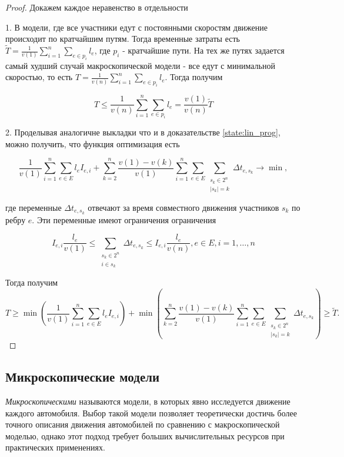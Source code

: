 \documentclass[12pt, a4paper]{article}
\DeclareMathOperator*{\minn}{min}
\begin{document}
\begin{proof}
	Докажем каждое неравенство в отдельности
	
	1. В модели, где все участники едут с постоянными скоростям движение происходит по кратчайшим путям. Тогда временные затраты есть $\widetilde{T} = \frac{1}{v(1)} \sum \limits _{i = 1} ^ n \sum\limits_{e \in p_i} l_e$, где $p_i$ - кратчайшие пути.
	На тех же путях задается самый худший случай макроскопической модели - все едут с минимальной скоростью, то есть $ T = \frac{1}{v(n)} \sum \limits _{i = 1} ^ n \sum\limits_{e \in p_i} l_e$. Тогда получим
	
	$$T \le  \frac{1}{v(n)} \sum \limits _{i = 1} ^ n \sum\limits_{e \in p_i} l_e = \frac {v(1)}{v(n)} \widetilde{T}$$
	
	2. Проделывая аналогичне выкладки что и в доказательстве \ref{state:lin_prog}, можно получить, что функция оптимизация есть 
	
	$$ \frac{1}{v (1)} \sum\limits_{i = 1}^n \sum \limits _{e \in E} l_e I_{e, i} +  \sum\limits_{k = 2}^{n} \frac{v(1) - v(k)}{v (1)}  \sum\limits_{i = 1}^n \sum \limits _{e \in E} \sum\limits _{\substack{ s_k \in 2^n \\ |s_k| = k}}  \Delta t_{e, s_k} \rightarrow \minn ,$$
	
	где переменные $\Delta t_{e, s_k}$ отвечают за время совместного движения участников $s_k$ по ребру $e$. Эти переменные имеют ограничения ограничения
    
    $$I_{e, i} \frac{l_e}{v(1)} \le  \sum\limits _{\substack{ s_k \in 2^n \\ i \in s_k}}  \Delta t_{e, s_k} \le I_{e, i} \frac{l_e}{v(n)} , e \in E,  i = 1, \dots, n$$
	
	Тогда получим
		$$T \ge 
		  \minn \left(  \frac{1}{v (1)} \sum\limits_{i = 1}^n \sum \limits _{e \in E} l_e I_{e, i} \right) 
		+ \minn \left(  \sum\limits_{k = 2}^{n} \frac{v(1) - v(k)}{v (1)}  \sum\limits_{i = 1}^n \sum \limits _{e \in E} \sum\limits _{\substack{ s_k \in 2^n \\ |s_k| = k}}  \Delta t_{e, s_k} \right) \ge \widetilde{T}.$$

\end{proof}

\subsection{Микроскопические модели}
\textit {Микроскопическими} называются модели, в которых явно исследуется движение каждого автомобиля.
Выбор такой модели позволяет теоретически достичь более точного описания движения автомобилей по сравнению с макроскопической моделью, однако этот подход требует больших вычислительных ресурсов при практических применениях.
\end{document}
